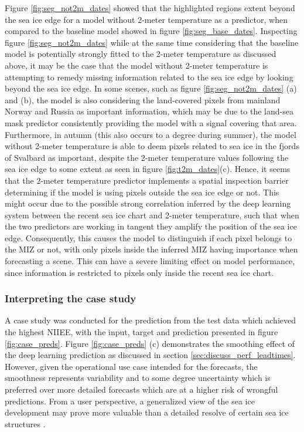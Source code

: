 \documentclass[../main/thesis]{subfiles}
\begin{document}
Figure \ref{fig:seg_not2m_dates} showed that the highlighted regions extent beyond the sea ice edge for a model without 2-meter temperature as a predictor, when compared to the baseline model showed in figure \ref{fig:seg_base_dates}. Inspecting figure \ref{fig:seg_not2m_dates} while at the same time considering that the baseline model is potentially strongly fitted to the 2-meter temperature as discussed above, it may be the case that the model without 2-meter temperature is attempting to remedy missing information related to the sea ice edge by looking beyond the sea ice edge. In some scenes, such as figure \ref{fig:seg_not2m_dates} (a) and (b), the model is also considering the land-covered pixels from mainland Norway and Russia as important information, which may be due to the land-sea mask predictor consistently providing the model with a signal covering that area. Furthermore, in autumn (this also occurs to a degree during summer), the model without 2-meter temperature is able to deem pixels related to sea ice in the fjords of Svalbard as important, despite the 2-meter temperature values following the sea ice edge to some extent as seen in figure \ref{fig:t2m_dates}(c). Hence, it seems that the 2-meter temperature predictor implements a spatial inspection barrier determining if the model is using pixels outside the sea ice edge or not. This might occur due to the possible strong correlation inferred by the deep learning system between the recent sea ice chart and 2-meter temperature, such that when the two predictors are working in tangent they amplify the position of the sea ice edge. Consequently, this causes the model to distinguish if each pixel belongs to the MIZ or not, with only pixels inside the inferred MIZ having importance when forecasting a scene. This can have a severe limiting effect on model performance, since information is restricted to pixels only inside the recent sea ice chart.

\subsubsection{Interpreting the case study}
A case study was conducted for the prediction from the test data which achieved the highest NIIEE, with the input, target and prediction presented in figure \ref{fig:case_preds}. Figure \ref{fig:case_preds} (c) demonstrates the smoothing effect of the deep learning prediction as discussed in section \ref{sec:discuss_perf_leadtimes}. However, given the operational use case intended for the forecasts, the smoothness represents variability and to some degree uncertainty which is preferred over more detailed forecasts which are at a higher risk of wrongful predictions. From a user perspective, a generalized view of the sea ice development may prove more valuable than a detailed resolve of certain sea ice structures \citep{Murphy1993}.
\end{document}
